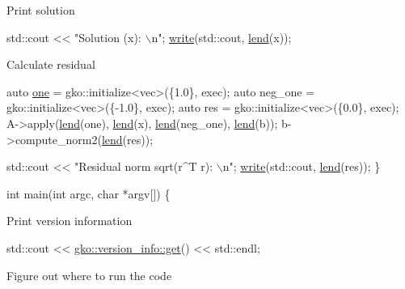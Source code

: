 Print solution


\begin{DoxyCode}
std::cout << \textcolor{stringliteral}{"Solution (x): \(\backslash\)n"};
\hyperlink{namespacegko_a859dc47a462721d83728d91ab7fa2148}{write}(std::cout, \hyperlink{namespacegko_aa8cb4876b72e5e1036ea9575443c439b}{lend}(x));
\end{DoxyCode}


Calculate residual


\begin{DoxyCode}
    \textcolor{keyword}{auto} \hyperlink{namespacegko_a0059e27f8f4bc348ff65c1e60caf47c8}{one} = gko::initialize<vec>(\{1.0\}, exec);
    \textcolor{keyword}{auto} neg\_one = gko::initialize<vec>(\{-1.0\}, exec);
    \textcolor{keyword}{auto} res = gko::initialize<vec>(\{0.0\}, exec);
    A->apply(\hyperlink{namespacegko_aa8cb4876b72e5e1036ea9575443c439b}{lend}(one), \hyperlink{namespacegko_aa8cb4876b72e5e1036ea9575443c439b}{lend}(x), \hyperlink{namespacegko_aa8cb4876b72e5e1036ea9575443c439b}{lend}(neg\_one), \hyperlink{namespacegko_aa8cb4876b72e5e1036ea9575443c439b}{lend}(b));
    b->compute\_norm2(\hyperlink{namespacegko_aa8cb4876b72e5e1036ea9575443c439b}{lend}(res));

    std::cout << \textcolor{stringliteral}{"Residual norm sqrt(r^T r): \(\backslash\)n"};
    \hyperlink{namespacegko_a859dc47a462721d83728d91ab7fa2148}{write}(std::cout, \hyperlink{namespacegko_aa8cb4876b72e5e1036ea9575443c439b}{lend}(res));
\}


\textcolor{keywordtype}{int} main(\textcolor{keywordtype}{int} argc, \textcolor{keywordtype}{char} *argv[])
\{
\end{DoxyCode}


Print version information


\begin{DoxyCode}
std::cout << \hyperlink{classgko_1_1version__info_a6daeb8a087cfb57fa055526fc133d8eb}{gko::version\_info::get}() << std::endl;
\end{DoxyCode}


Figure out where to run the code


